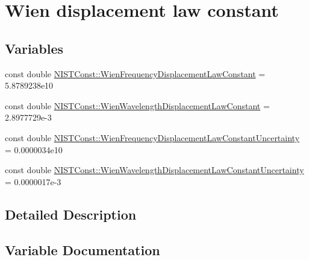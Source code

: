 \hypertarget{group___n_i_s_t_const-_wien_displacement}{}\section{Wien displacement law constant}
\label{group___n_i_s_t_const-_wien_displacement}
\subsection*{Variables}
\begin{DoxyCompactItemize}
\item 
const double \hyperlink{group___n_i_s_t_const-_wien_displacement_ga73d0d9fcd8606de359046224389369e8}{N\+I\+S\+T\+Const\+::\+Wien\+Frequency\+Displacement\+Law\+Constant} = 5.\+8789238e10
\item 
const double \hyperlink{group___n_i_s_t_const-_wien_displacement_gadd11261f459797b1750250b9d3ada92a}{N\+I\+S\+T\+Const\+::\+Wien\+Wavelength\+Displacement\+Law\+Constant} = 2.\+8977729e-\/3
\item 
const double \hyperlink{group___n_i_s_t_const-_wien_displacement_gaca098160e158d864be00636a56ef80f0}{N\+I\+S\+T\+Const\+::\+Wien\+Frequency\+Displacement\+Law\+Constant\+Uncertainty} = 0.\+0000034e10
\item 
const double \hyperlink{group___n_i_s_t_const-_wien_displacement_gaec057ed85042dd0ce17f1f38fdbba4e6}{N\+I\+S\+T\+Const\+::\+Wien\+Wavelength\+Displacement\+Law\+Constant\+Uncertainty} = 0.\+0000017e-\/3
\end{DoxyCompactItemize}


\subsection{Detailed Description}


\subsection{Variable Documentation}
\mbox{\label{group___n_i_s_t_const-_wien_displacement_ga73d0d9fcd8606de359046224389369e8}} 
